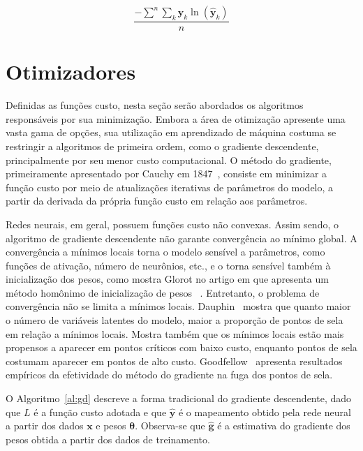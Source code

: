 \begin{equation} \label{eq:cec}
    \frac{-\displaystyle\sum^n \sum_k \mathbf{y}_k \ln(\mathbf{\hat{y}}_k)}{n}
\end{equation}

\section{Otimizadores} \label{sec:optimizers}

Definidas as funções custo, nesta seção serão abordados os algoritmos responsáveis por sua minimização.
Embora a área de otimização apresente uma vasta gama de opções, sua utilização em aprendizado de máquina costuma se
restringir a algoritmos de primeira ordem, como o gradiente descendente, principalmente por seu menor custo
computacional.
O método do gradiente, primeiramente apresentado por Cauchy em 1847~\cite{cauchy1847}, consiste em minimizar a função
custo por meio de atualizações iterativas de parâmetros do modelo, a partir da derivada da própria função custo em
relação aos parâmetros.

Redes neurais, em geral, possuem funções custo não convexas.
Assim sendo, o algoritmo de gradiente descendente não garante convergência ao mínimo global.
A convergência a mínimos locais torna o modelo sensível a parâmetros, como funções de ativação, número de neurônios,
etc., e o torna sensível também à inicialização dos pesos, como mostra Glorot no artigo em que apresenta um método
homônimo de inicialização de pesos ~\cite{glorot10}.
Entretanto, o problema de convergência não se limita a mínimos locais.
Dauphin~\cite{dauphin14} mostra que quanto maior o número de variáveis latentes do modelo, maior a proporção de pontos
de sela em relação a mínimos locais.
Mostra também que os mínimos locais estão mais propensos a aparecer em pontos críticos com baixo custo, enquanto pontos
de sela costumam aparecer em pontos de alto custo.
Goodfellow~\cite{goodfellow14} apresenta resultados empíricos da efetividade do método do gradiente na fuga dos pontos
de sela.

O Algoritmo~\ref{al:gd} descreve a forma tradicional do gradiente descendente, dado que $L$ é a função custo adotada e
que $\mathbf{\hat{y}}$ é o mapeamento obtido pela rede neural a partir dos dados $\mathbf{x}$ e pesos
$\boldsymbol{\theta}$.
Observa-se que $\mathbf{\hat{g}}$ é a estimativa do gradiente dos pesos obtida a partir dos dados de treinamento.

